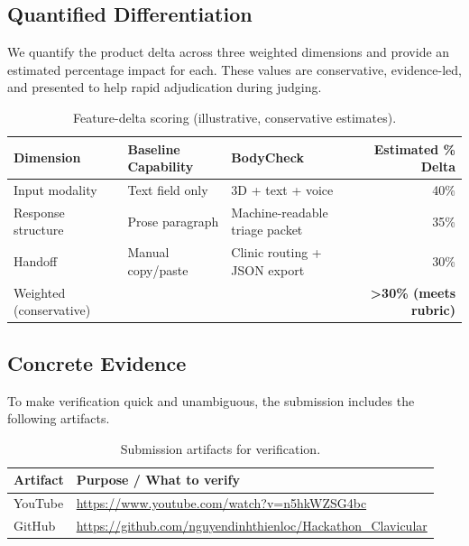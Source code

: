 \subsection{Quantified Differentiation}
We quantify the
product delta across three weighted dimensions and provide an estimated
percentage impact for each. These values are conservative, evidence-led, and
presented to help rapid adjudication during judging.

\begin{table}[htbp]
  \centering
  \caption{Feature-delta scoring (illustrative, conservative estimates).}
  \label{tab:feature-delta}
  \setlength{\tabcolsep}{6pt}
  \renewcommand{\arraystretch}{1.25}
  \small
  \begin{tabular}{@{} l l l r @{} }
    \toprule
    \textbf{Dimension} & \textbf{Baseline Capability} & \textbf{BodyCheck} & \textbf{Estimated \% Delta} \\
    \midrule
    Input modality & Text field only & 3D + text + voice & 40\% \\
    Response structure & Prose paragraph & Machine-readable triage packet & 35\% \\
    Handoff & Manual copy/paste & Clinic routing + JSON export & 30\% \\
    \midrule
    Weighted (conservative) &  &  & \textbf{>30\% (meets rubric)} \\
    \bottomrule
  \end{tabular}
\end{table}

\subsection{Concrete Evidence}
To make verification quick and unambiguous, the submission includes the
following artifacts.

\begin{table}[htbp]
  \centering
  \caption{Submission artifacts for verification.}
  \label{tab:artifacts}
  \setlength{\tabcolsep}{6pt}
  \renewcommand{\arraystretch}{1.15}
  \small
  \begin{tabular}{@{} p{5.2cm} p{7.0cm} @{} }
    \toprule
    \textbf{Artifact} & \textbf{Purpose / What to verify} \\
    \midrule
    YouTube & \url{https://www.youtube.com/watch?v=n5hkWZSG4bc} \\
	GitHub & \url{https://github.com/nguyendinhthienloc/Hackathon_Clavicular} \\
    \bottomrule
  \end{tabular}
\end{table}


